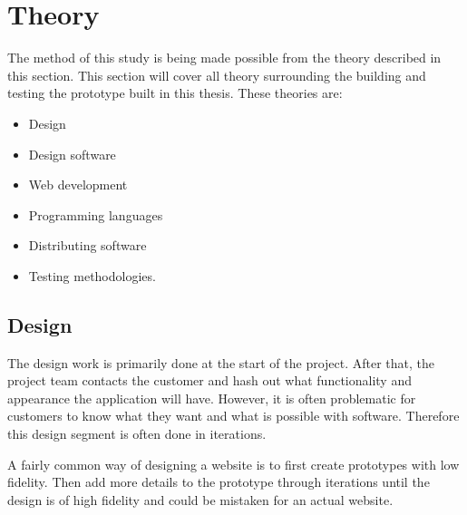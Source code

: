 \newpage
\section{Theory}

The method of this study is being made possible from the theory described in this section. This section will cover all theory surrounding the building and testing the prototype built in this thesis. These theories are: 
\begin{itemize}
  \item Design
  \item Design software
  \item Web development
  \item Programming languages
  \item Distributing software
  \item Testing methodologies. 
\end{itemize}





\subsection{Design}%
\label{sub:Design}
The design work is primarily done at the start of the project. After that, the project team contacts the customer and hash out what functionality and appearance the application will have. However, it is often problematic for customers to know what they want and what is possible with software. Therefore this design segment is often done in iterations. 

A fairly common way of designing a website is to first create prototypes with low fidelity. Then add more details to the prototype through iterations until the design is of high fidelity and could be mistaken for an actual website. 


